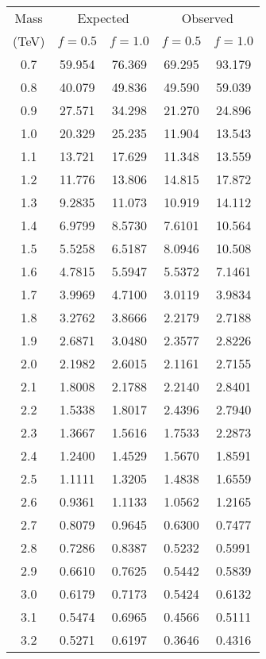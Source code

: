 \begin{table}[h!]
\begin{center}
\begin{tabular}{c||cc||cc}
\hline
Mass     & \multicolumn{2}{c}{Expected} & \multicolumn{2}{c}{Observed} \\
(\unit{TeV}) & $f=0.5$  & $f=1.0$ & $f=0.5$ & $f=1.0$  \\
\hline
\hline
0.7 & 59.954  &  76.369 & 69.295 &  93.179 \\
0.8 & 40.079  &  49.836 & 49.590 &  59.039 \\
0.9 & 27.571  &  34.298 & 21.270 &  24.896 \\
1.0 & 20.329  &  25.235 & 11.904 &  13.543 \\
1.1 & 13.721  &  17.629 & 11.348 &  13.559 \\
1.2 & 11.776  &  13.806 & 14.815 &  17.872 \\
1.3 & 9.2835  &  11.073 & 10.919 &  14.112 \\
1.4 & 6.9799  &  8.5730 & 7.6101 &  10.564 \\
1.5 & 5.5258  &  6.5187 & 8.0946 &  10.508 \\
1.6 & 4.7815  &  5.5947 & 5.5372 &  7.1461 \\
1.7 & 3.9969  &  4.7100 & 3.0119 &  3.9834 \\
1.8 & 3.2762  &  3.8666 & 2.2179 &  2.7188 \\
1.9 & 2.6871  &  3.0480 & 2.3577 &  2.8226 \\
2.0 & 2.1982  &  2.6015 & 2.1161 &  2.7155 \\
2.1 & 1.8008  &  2.1788 & 2.2140 &  2.8401 \\
2.2 & 1.5338  &  1.8017 & 2.4396 &  2.7940 \\
2.3 & 1.3667  &  1.5616 & 1.7533 &  2.2873 \\
2.4 & 1.2400  &  1.4529 & 1.5670 &  1.8591 \\
2.5 & 1.1111  &  1.3205 & 1.4838 &  1.6559 \\
2.6 & 0.9361  &  1.1133 & 1.0562 &  1.2165 \\
2.7 & 0.8079  &  0.9645 & 0.6300 &  0.7477 \\
2.8 & 0.7286  &  0.8387 & 0.5232 &  0.5991 \\
2.9 & 0.6610  &  0.7625 & 0.5442 &  0.5839 \\
3.0 & 0.6179  &  0.7173 & 0.5424 &  0.6132 \\
3.1 & 0.5474  &  0.6965 & 0.4566 &  0.5111 \\
3.2 & 0.5271  &  0.6197 & 0.3646 &  0.4316 \\

\end{tabular}
\end{center}
\end{table}
